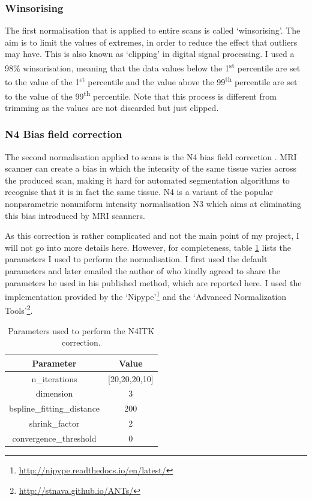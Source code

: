 \documentclass[12pt,a4paper,twoside,openright]{report}
\begin{document}
\subsubsection{Winsorising}
The first normalisation that is applied to entire scans is called `winsorising'. The aim is to limit the values of extremes, in order to reduce the effect that outliers may have. This is also known as `clipping' in digital signal processing. I used a 98\% winsorisation, meaning that the data values below the 1\textsuperscript{st} percentile are set to the value of the 1\textsuperscript{st} percentile and the value above the 99\textsuperscript{th} percentile are set to the value of the 99\textsuperscript{th} percentile. Note that this process is different from trimming as the values are not discarded but just clipped.

\subsubsection{N4 Bias field correction}
The second normalisation applied to scans is the N4 bias field correction \cite{n4itk}. MRI scanner can create a bias in which the intensity of the same tissue varies across the produced scan, making it hard for automated segmentation algorithms to recognise that it is in fact the same tissue. N4 is a variant of the popular nonparametric nonuniform intensity normalisation N3 which aims at eliminating this bias introduced by MRI scanners. 

As this correction is rather complicated and not the main point of my project, I will not go into more details here. However, for completeness, table \ref{table:n4_params} lists the parameters I used to perform the normalisation. I first used the default parameters and later emailed the author of \cite{pereira} who kindly agreed to share the parameters he used in his published method, which are reported here. I used the implementation provided by the `Nipype'\footnote{\url{http://nipype.readthedocs.io/en/latest/}} and the `Advanced Normalization Tools'\footnote{\url{http://stnava.github.io/ANTs/}}.

\begin{table}[h]
\centering	
\begin{tabular}{ c c } 
\textbf{Parameter} & \textbf{Value} \\
 \hline
 n\_iterations & [20,20,20,10] \\ 
 dimension & 3 \\
 bspline\_fitting\_distance & 200 \\
 shrink\_factor & 2\\
 convergence\_threshold & 0
\end{tabular}
\caption{Parameters used to perform the N4ITK correction.}
\label{table:n4_params}
\end{table}
\end{document}
